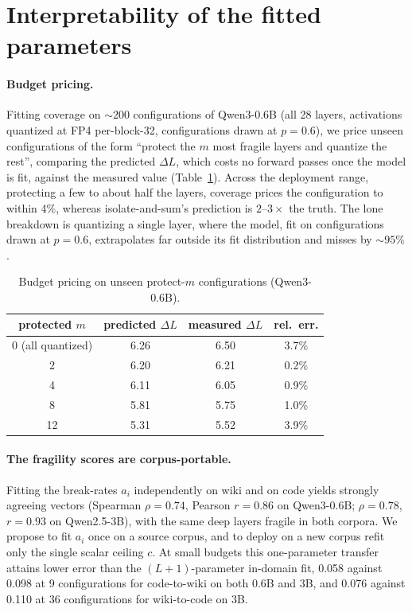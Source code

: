 \section{Interpretability of the fitted parameters}\label{sec:interp}

\paragraph{Budget pricing.} Fitting coverage on ${\sim}200$ configurations of Qwen3-0.6B (all 28
layers, activations quantized at FP4 per-block-32, configurations drawn at $p=0.6$), we price
unseen configurations of the form ``protect the $m$ most fragile layers and quantize the rest'',
comparing the predicted $\Delta L$, which costs no forward passes once the model is fit, against the
measured value (Table~\ref{tab:budget}). Across the deployment range, protecting a few to about half
the layers, coverage prices the configuration to within 4\%, whereas isolate-and-sum's prediction is
$2$--$3\times$ the truth. The lone breakdown is quantizing a single layer, where the model, fit on
configurations drawn at $p=0.6$, extrapolates far outside its fit distribution and misses by
${\sim}95\%$.

\begin{table}[t]
\centering\small
\caption{Budget pricing on unseen protect-$m$ configurations (Qwen3-0.6B).}
\label{tab:budget}
\begin{tabular}{cccc}
\toprule
protected $m$ & predicted $\Delta L$ & measured $\Delta L$ & rel.\ err. \\
\midrule
0 (all quantized) & 6.26 & 6.50 & 3.7\% \\
2  & 6.20 & 6.21 & 0.2\% \\
4  & 6.11 & 6.05 & 0.9\% \\
8  & 5.81 & 5.75 & 1.0\% \\
12 & 5.31 & 5.52 & 3.9\% \\
\bottomrule
\end{tabular}
\end{table}

\paragraph{The fragility scores are corpus-portable.} Fitting the break-rates $a_i$ independently on
wiki and on code yields strongly agreeing vectors (Spearman $\rho = 0.74$, Pearson $r = 0.86$ on
Qwen3-0.6B; $\rho = 0.78$, $r = 0.93$ on Qwen2.5-3B), with the same deep layers fragile in both
corpora. 
We propose to fit $a_i$ once on a source corpus, and to deploy on a new corpus refit only the single scalar ceiling
$c$. At small budgets this one-parameter transfer attains lower error than the $(L{+}1)$-parameter
in-domain fit, 0.058 against 0.098 at 9 configurations for code-to-wiki on both 0.6B and 3B, and 0.076
against 0.110 at 36 configurations for wiki-to-code on 3B.


